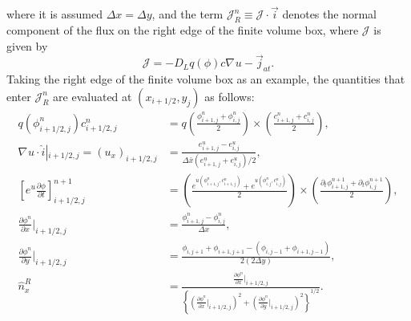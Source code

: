 \documentclass[a4paper,12pt]{article}
\newcommand{\grad}[1]{\nabla_{#1}}
\newcommand{\op}[1]{\mathcal{#1}}
\begin{document}
where it is assumed $\Delta x = \Delta y$, and the term $\op{J}^n_R \equiv \op{J} \cdot \vec{i}$ denotes the normal component of the flux on the right edge of the finite volume box, where $\op{J}$ is given by 
\begin{equation}
\op{J} = -D_L q(\phi) c  \grad{} u - \vec{j}_{at}.
\end{equation} 
Taking the right edge of the finite volume box as an example, the quantities that enter $\op{J}_R^n$ are evaluated at $(x_{i+1/2},y_j)$ as follows:
\begin{align}
q(\phi^n_{i+1/2,j}) c^n_{i+1/2,j} &= q\left( \frac{\phi^n_{i+1,j} + \phi^n_{i,j}}{2} \right) \times \left( \frac{c^n_{i+1,j} + c^n_{i,j}}{2} \right), \\
\grad{} u \cdot \hat{i} \left|_{i+1/2,j} \right. =(u_x)_{i+1/2,j} &= \frac{e^u_{i+1,j} - e^u_{i,j}}{\Delta \bar{x} (e^u_{i+1,j}+e^u_{i,j})/2}, \\
\left[ e^u \frac{\partial \phi}{\partial t} \right]_{i+1/2,j}^{n+1} &= \left( \frac{e^{u(\phi^n_{i+1,j}, c^n_{i+1,j})} + e^{u(\phi^n_{i,j}, c^n_{i,j})} }{2} \right) \times  \left( \frac{\partial_t \phi^{n+1}_{i+1,j} + \partial_t \phi^{n+1}_{i,j}}{2} \right), \\
\frac{\partial \phi^n}{\partial x} \bigg|_{i+1/2,j}  &= \frac{\phi^n_{i+1,j}- \phi^n_{i,j}}{\Delta x} , \\
\frac{\partial \phi^n}{\partial y} \bigg|_{i+1/2,j}  &= \frac{\phi_{i,j+1}+\phi_{i+1,j+1} - (\phi_{i,j-1} + \phi_{i+1,j-1}) }{2(2\Delta y)} , \\
\hat{n}_x^R &= \frac{\frac{\partial \phi^n}{\partial x} \bigg|_{i+1/2,j}  }{ \left\{  \left( \frac{\partial \phi^n}{\partial x} |_{i+1/2,j} \right)^2  + \left( \frac{\partial \phi^n}{\partial y} |_{i+1/2,j} \right)^2 \right\}^{1/2} }.
\end{align}


% 
% 



\end{document}
